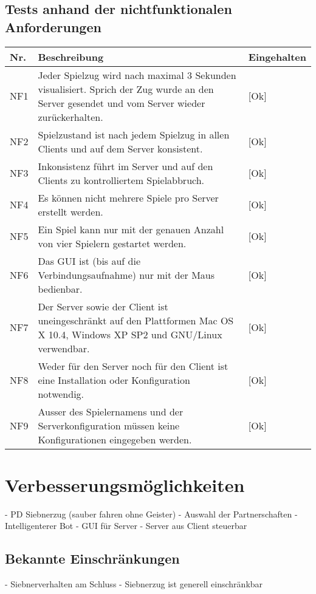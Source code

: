 \documentclass[12pt,halfparskip]{scrartcl}
\begin{document}
\subsection{Tests anhand der nichtfunktionalen Anforderungen}
	\begin {tabular}{l p{11cm} l}
		\toprule
		\textbf{Nr.} & \textbf{Beschreibung} & \textbf{Eingehalten} \\
		\midrule
		NF1 & Jeder Spielzug wird nach maximal 3 Sekunden visualisiert. Sprich der Zug wurde an den Server gesendet und vom Server wieder zurückerhalten. & [Ok] \\
		NF2 & Spielzustand ist nach jedem Spielzug in allen Clients und auf dem Server konsistent. & [Ok] \\
		NF3 & Inkonsistenz führt im Server und auf den Clients zu kontrolliertem Spielabbruch. & [Ok] \\
		NF4 & Es können nicht mehrere Spiele pro Server erstellt werden. & [Ok] \\
		NF5 & Ein Spiel kann nur mit der genauen Anzahl von vier Spielern gestartet werden. & [Ok] \\
		NF6 & Das GUI ist (bis auf die Verbindungsaufnahme) nur mit der Maus bedienbar. & [Ok] \\
		NF7 & Der Server sowie der Client ist uneingeschränkt auf den Plattformen Mac OS X 10.4, Windows XP SP2 und GNU/Linux verwendbar. & [Ok] \\
		NF8 & Weder für den Server noch für den Client ist eine Installation oder Konfiguration notwendig. & [Ok] \\
		NF9 & Ausser des Spielernamens und der Serverkonfiguration müssen keine Konfigurationen eingegeben werden. & [Ok] \\
		\bottomrule
	\end{tabular}
	
\section{Verbesserungsmöglichkeiten}
- PD Siebnerzug (sauber fahren ohne Geister)
- Auswahl der Partnerschaften
- Intelligenterer Bot
- GUI für Server
- Server aus Client steuerbar
\subsection{Bekannte Einschränkungen}
- Siebnerverhalten am Schluss 
- Siebnerzug ist generell einschränkbar
\end{document}
